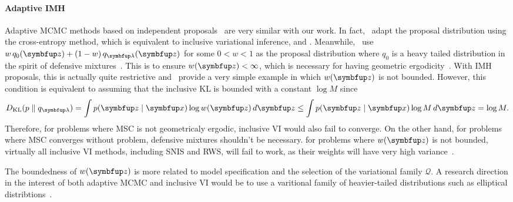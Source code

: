 \paragraph{Adaptive IMH}
Adaptive MCMC methods based on independent proposals~\citep{andrieu_ergodicity_2006, keith_adaptive_2008, holden_adaptive_2009, giordani_adaptive_2010} are very similar with our work.
In fact,~\citet{keith_adaptive_2008} adapt the proposal distribution using the cross-entropy method, which is equivalent to inclusive variational inference, and .
Meanwhile,~\citet{giordani_adaptive_2010} use \(w\,q_0(\vz) + (1-w)\,q_{\vlambda}(\vz)\) for some \(0<w<1\) as the proposal distribution where \(q_0\) is a heavy tailed distribution in the spirit of defensive mixtures~\citep{hesterberg_weighted_1995}.
This is to ensure \(w(\vz) < \infty\), which is necessary for having geometric ergodicity~\citep{10.2307/2242610}.
With IMH proposals, this is actually quite restrictive and~\citet{10.1007/s11222-008-9110-y} provide a very simple example in which \(w(\vz)\) is not bounded.
However, this condition is equivalent to assuming that the inclusive KL is bounded with a constant \(\log M\) since
\begin{align}
  \DKL{p}{q_{\vlambda}} = \int p(\vz\mid\vx) \log w(\vz)\,d\vz \leq \int p(\vz\mid\vx) \log M \, d\vz = \log M.
\end{align}
Therefore, for problems where MSC is not geometricaly ergodic, inclusive VI would also fail to converge.
On the other hand, for problems where MSC converges without problem, defensive mixtures shouldn't be necessary.
for problems where \(w(\vz)\) is not bounded, virtually all inclusive VI methods, including SNIS and RWS, will fail to work, as their weights will have very high variance~\citep{mcbook}.

The boundedness of \(w(\vz)\) is more related to model specification and the selection of the variational family \(\mathcal{Q}\).
A research direction in the interest of both adaptive MCMC and inclusive VI would be to use a varitional family of heavier-tailed distributions such as elliptical distribtions~\citet{NEURIPS2018_25db67c5}.

